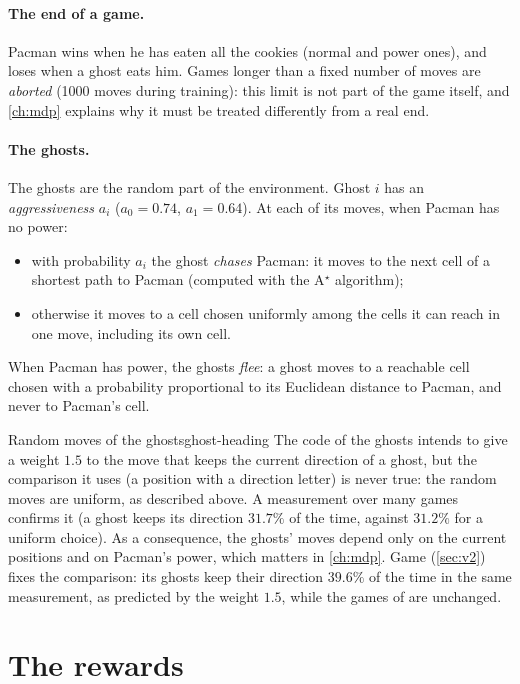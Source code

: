 \paragraph{The end of a game.} Pacman wins when he has eaten all the
cookies (normal and power ones), and loses when a ghost eats him. Games
longer than a fixed number of moves are \emph{aborted} (1000 moves during
training): this limit is not part of the game itself, and
\cref{ch:mdp} explains why it must be treated differently from a real end.

\paragraph{The ghosts.} The ghosts are the random part of the environment.
Ghost $i$ has an \emph{aggressiveness} $a_i$ ($a_0 = 0.74$, $a_1 = 0.64$).
At each of its moves, when Pacman has no power:
\begin{itemize}[nosep]
  \item with probability $a_i$ the ghost \emph{chases} Pacman: it moves to
    the next cell of a shortest path to Pacman (computed with the A$^\star$
    algorithm);
  \item otherwise it moves to a cell chosen uniformly among the cells it can
    reach in one move, including its own cell.
\end{itemize}
When Pacman has power, the ghosts \emph{flee}: a ghost moves to a reachable
cell chosen with a probability proportional to its Euclidean distance to
Pacman, and never to Pacman's cell.

\begin{remark}{Random moves of the ghosts}{ghost-heading}
  The code of the ghosts intends to give a weight $1.5$ to the move that
  keeps the current direction of a ghost, but the comparison it uses (a
  position with a direction letter) is never true: the random moves are
  uniform, as described above. A measurement over many games confirms it
  (a ghost keeps its direction $31.7\%$ of the time, against $31.2\%$ for a
  uniform choice). As a consequence, the ghosts' moves depend only on the
  current positions and on Pacman's power, which matters in
  \cref{ch:mdp}. Game  (\cref{sec:v2}) fixes the comparison: its
  ghosts keep their direction $39.6\%$ of the time in the same measurement,
  as predicted by the weight $1.5$, while the games of  are
  unchanged.
\end{remark}

\section{The rewards}
\label{sec:rewards}

